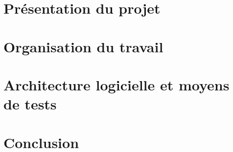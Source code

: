 \documentclass[a4paper,11pt]{article}
\begin{document}
\pagestyle{plain}


\selectfont

\makeTitlePage %

\clearpage
{}\selectfont

\begin{Large}
\tableofcontents
\end{Large}

\clearpage

\section{Présentation du projet}


\section{Organisation du travail}


\clearpage

\section{Architecture logicielle et moyens de tests}


\clearpage

\section{Conclusion}


\makeAbstractPage
\pagestyle{empty}
\end{document}

